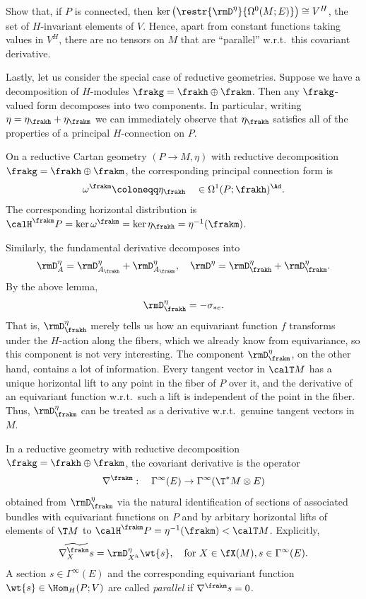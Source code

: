 \begin{xca}
    Show that, if $P$ is connected, then $\ker\left(\restr{\rmD^\eta}{\Omega^0(M;E)}\right)\cong V^H$, the set of $H$-invariant elements of $V$. Hence, apart from constant functions taking values in $V^H$, there are no tensors on $M$ that are ``parallel'' w.r.t.\ this covariant derivative.
\end{xca}

Lastly, let us consider the special case of reductive geometries. Suppose we have a decomposition of $H$-modules $\frakg=\frakh\oplus\frakm$. Then any $\frakg$-valued form decomposes into two components. In particular, writing $\eta=\eta_\frakh+\eta_\frakm$ we can immediately observe that $\eta_\frakh$ satisfies all of the properties of a principal $H$-connection on $P$. 

\begin{defn}
    On a reductive Cartan geometry $(P\to M,\eta)$ with reductive decomposition $\frakg=\frakh\oplus\frakm$, the corresponding principal connection form is 
    \[\omega^\frakm\coloneqq \eta_\frakh\quad \in\Omega^1(P;\frakh)^\Ad.\]
    The corresponding horizontal distribution is $\calH^\frakm P=\ker\omega^\frakm=\ker\eta_\frakh=\eta^{-1}(\frakm)$.
\end{defn}

Similarly, the fundamental derivative decomposes into 
\[\rmD^\eta_A=\rmD^\eta_{A_\frakh}+\rmD^\eta_{A_\frakm},\quad \rmD^\eta=\rmD^\eta_\frakh+\rmD^\eta_\frakm.\] 
By the above lemma,
\[\rmD^\eta_\frakh=-\sigma_{\ast e}.\]
That is, $\rmD^\eta_\frakh$ merely tells us how an equivariant function $f$ transforms under the $H$-action along the fibers, which we already know from equivariance, so this component is not very interesting. The component $\rmD^\eta_\frakm$, on the other hand, contains a lot of information. Every tangent vector in $\calT M$ has a unique horizontal lift to any point in the fiber of $P$ over it, and the derivative of an equivariant function w.r.t.\ such a lift is independent of the point in the fiber. Thus, $\rmD^\eta_\frakm$ can be treated as a derivative w.r.t.\ genuine tangent vectors in $M$.

\begin{defn}
    In a reductive geometry with reductive decomposition $\frakg=\frakh\oplus\frakm$, the covariant derivative is the operator 
    \[\nabla^\frakm:\quad \Gamma^\infty(E)\to \Gamma^\infty(\T^\ast M\otimes E)\]
    obtained from $\rmD^\eta_\frakm$ via the natural identification of sections of associated bundles with equivariant functions on $P$ and by arbitary horizontal lifts of elements of $\T M$ to $\calH^\frakm P=\eta^{-1}(\frakm)<\calT M$. Explicitly,
    \[\widetilde{\nabla^\frakm_X s}=\rmD^\eta_{X^h}\wt{s}, \quad \text{for }X\in\fX(M),s\in\Gamma^\infty(E).\]
    A section $s\in\Gamma^\infty(E)$ and the corresponding equivariant function $\wt{s}\in\Hom_H(P;V)$ are called \emph{parallel} if $\nabla^\frakm s=0$.
\end{defn}

